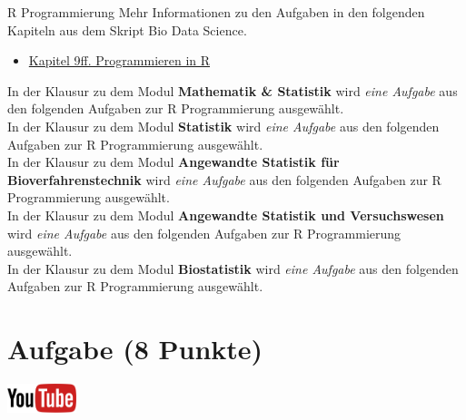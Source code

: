 \documentclass[a4paper, 10pt]{scrartcl}\usepackage[]{graphicx}\usepackage[]{xcolor}
\begin{document}
 
\clearpage
\begin{graybox}{R Programmierung}
Mehr Informationen zu den Aufgaben in den folgenden Kapiteln aus dem Skript Bio Data Science.
  \begin{itemize}
  \item \href{https://jkruppa.github.io/programing-preface.html}{Kapitel 9ff. Programmieren in R}
  \end{itemize}
In der Klausur zu dem Modul \textbf{Mathematik \& Statistik} wird \textit{eine Aufgabe} aus den folgenden Aufgaben zur R Programmierung ausgewählt. \\

In der Klausur zu dem Modul \textbf{Statistik} wird \textit{eine Aufgabe} aus den folgenden Aufgaben zur R Programmierung ausgewählt.  \\

In der Klausur zu dem Modul \textbf{Angewandte Statistik für Bioverfahrenstechnik} wird \textit{eine Aufgabe} aus den folgenden Aufgaben zur R Programmierung ausgewählt.  \\

In der Klausur zu dem Modul \textbf{Angewandte Statistik und Versuchswesen} wird \textit{eine Aufgabe} aus den folgenden Aufgaben zur R Programmierung ausgewählt.  \\

In der Klausur zu dem Modul \textbf{Biostatistik} wird \textit{eine Aufgabe} aus den folgenden Aufgaben zur R Programmierung ausgewählt.  \\

\end{graybox}
\clearpage

\section{Aufgabe \hfill (8 Punkte)}

\hfill\href{https://youtu.be/Bo0VOhBhJmA}{\includegraphics[width =
  2cm]{img/youtube}}\\[1Ex]
\end{document}
